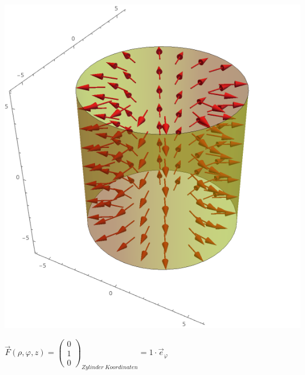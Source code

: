 					\formulaEnd
					\begin{center}

					\includegraphics[scale=0.4]{zylindric_rho.png}

					\end{center}


					\formulaBegin
						$\vec{F}(\rho, \varphi, z) = \left(\begin{array}{c} 0 \\ 1 \\ 0 \end{array}\right)_{Zylinder\ Koordinaten} = 1 \cdot \vec{e}_\varphi$ \\

